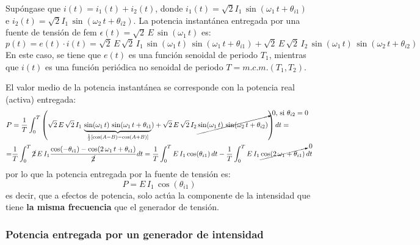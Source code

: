 Supóngase que $i(t) = i_1(t) + i_2(t)$, donde
$i_1(t)=\sqrt{2}I_{1}\,\sin(\omega_1\,t+\theta_{i1})$ e
$i_2(t)=\sqrt{2}I_{1}\,\sin(\omega_2\,t+\theta_{i2})$. La potencia
instantánea entregada por una fuente de tensión de fem
$\epsilon(t)=\sqrt{2}\,E\,\sin(\omega_1\,t)$ es:
\begin{equation*}
  p(t) = e(t)\cdot i(t) = \sqrt{2}\,E\, \sqrt{2}\,I_{1}\,\sin(\omega_1\,t)\,\sin(\omega_1\,t+\theta_{i1}) +\sqrt{2}\,E\, \sqrt{2}\,I_{2}\,\sin(\omega_1\,t)\,\sin(\omega_2\,t+\theta_{i2})
\end{equation*} 
En este caso, se tiene que $e(t)$ es una función senoidal de periodo
$T_1$, mientras que $i(t)$ es una función periódica no senoidal de
periodo $T=m.c.m.(T_1,T_2)$.

El valor medio de la potencia instantánea se corresponde con la
potencia real (activa) entregada:
\begin{align*}
  P&=\dfrac{1}{T}\int_0^{T}\left( \sqrt{2}\,E\,\sqrt{2}\, I_{1}\,\underbrace{\sin(\omega_1\,t)\,\sin(\omega_1\,t+\theta_{i1}}_{\frac{1}{2}\left[\cos(A-B)-\cos(A+B)\right]}) + \sqrt{2}\,E\,\sqrt{2}\, I_{2}\,\cancelto{\text{0, si $\theta_{i2}=0$}}{\sin(\omega_1\,t)\,\sin(\omega_2\,t+\theta_{i2})}\right)dt=\\
  =&\dfrac{1}{T}\int_0^T \cancel{2}\,E\,I_{1}\dfrac{\cos(-\theta_{i1})-\cos(2\,\omega_1\,t+\theta_{i1})}{\cancel{2}}dt =\dfrac{1}{T}\int_0^T E\,I_{1}\,{\cos(\theta_{i1})}\,dt-\dfrac{1}{T}\int_0^T E\,I_{1}\,\cancelto{0}{{\cos(2\,\omega_1+\theta_{i1})}}\,dt
\end{align*}
por lo que la potencia entregada por la fuente de tensión es:
\begin{equation}\label{eq:P_E_superposicion}
  \boxed{P=E\,I_1\,\cos(\theta_{i1})}
\end{equation}
es decir, que a efectos de potencia, solo actúa la componente de la
intensidad que tiene \textbf{la misma frecuencia} que el generador de
tensión.

\subsubsection{Potencia entregada por un generador de intensidad}

